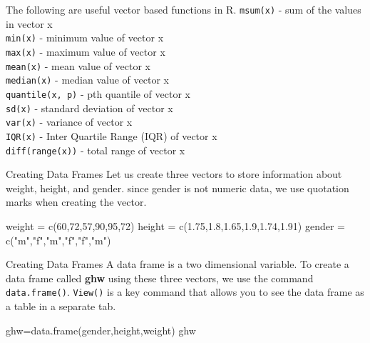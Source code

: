 \documentclass[
  ignorenonframetext,
]{beamer}
\newenvironment{Shaded}{\begin{snugshade}}{\end{snugshade}}
\newcommand{\DecValTok}[1]{\textcolor[rgb]{0.00,0.00,0.81}{#1}}
\newcommand{\FloatTok}[1]{\textcolor[rgb]{0.00,0.00,0.81}{#1}}
\newcommand{\FunctionTok}[1]{\textcolor[rgb]{0.00,0.00,0.00}{#1}}
\newcommand{\NormalTok}[1]{#1}
\newcommand{\OtherTok}[1]{\textcolor[rgb]{0.56,0.35,0.01}{#1}}
\newcommand{\StringTok}[1]{\textcolor[rgb]{0.31,0.60,0.02}{#1}}
\begin{document}
\begin{frame}[fragile]{The following are useful vector based functions
in R.}
\protect\hypertarget{the-following-are-useful-vector-based-functions-in-r.}{}
\texttt{msum(x)} - sum of the values in vector x\\
\texttt{min(x)} - minimum value of vector x\\
\texttt{max(x)} - maximum value of vector x\\
\texttt{mean(x)} - mean value of vector x\\
\texttt{median(x)} - median value of vector x\\
\texttt{quantile(x,\ p)} - pth quantile of vector x\\
\texttt{sd(x)} - standard deviation of vector x\\
\texttt{var(x)} - variance of vector x\\
\texttt{IQR(x)} - Inter Quartile Range (IQR) of vector x\\
\texttt{diff(range(x))} - total range of vector x
\end{frame}

\begin{frame}[fragile]{Creating Data Frames}
\protect\hypertarget{creating-data-frames}{}
Let us create three vectors to store information about weight, height,
and gender. since gender is not numeric data, we use quotation marks
when creating the vector.

\begin{Shaded}
\begin{Highlighting}[]
\NormalTok{weight }\OtherTok{=} \FunctionTok{c}\NormalTok{(}\DecValTok{60}\NormalTok{,}\DecValTok{72}\NormalTok{,}\DecValTok{57}\NormalTok{,}\DecValTok{90}\NormalTok{,}\DecValTok{95}\NormalTok{,}\DecValTok{72}\NormalTok{)}
\NormalTok{height }\OtherTok{=} \FunctionTok{c}\NormalTok{(}\FloatTok{1.75}\NormalTok{,}\FloatTok{1.8}\NormalTok{,}\FloatTok{1.65}\NormalTok{,}\FloatTok{1.9}\NormalTok{,}\FloatTok{1.74}\NormalTok{,}\FloatTok{1.91}\NormalTok{)}
\NormalTok{gender }\OtherTok{=} \FunctionTok{c}\NormalTok{(}\StringTok{"m"}\NormalTok{,}\StringTok{"f"}\NormalTok{,}\StringTok{"m"}\NormalTok{,}\StringTok{"f"}\NormalTok{,}\StringTok{"f"}\NormalTok{,}\StringTok{"m"}\NormalTok{)}
\end{Highlighting}
\end{Shaded}
\end{frame}

\begin{frame}[fragile]{Creating Data Frames}
\protect\hypertarget{creating-data-frames-1}{}
A data frame is a two dimensional variable. To create a data frame
called \textbf{ghw} using these three vectors, we use the command
\texttt{data.frame()}. \texttt{View()} is a key command that allows you
to see the data frame as a table in a separate tab.

\begin{Shaded}
\begin{Highlighting}[]
\NormalTok{ghw}\OtherTok{=}\FunctionTok{data.frame}\NormalTok{(gender,height,weight)}
\NormalTok{ghw}
\end{Highlighting}
\end{Shaded}
\end{frame}
\end{document}
